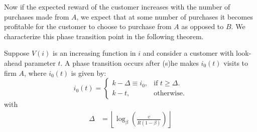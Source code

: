 Now if the expected reward of the customer increases with the number of purchases made from $A$, we expect that at some number of purchases it becomes profitable for the customer to choose to purchase from $A$ as opposed to $B$.
We characterize this phase transition point in the following theorem.

\begin{theorem} Suppose $V(i)$ is an increasing function in $i$ and consider a customer with look-ahead parameter $t$. A phase transition occurs after (s)he makes $i_0(t)$ visits to firm $A$, where $i_0(t)$ is given by:
\begin{equation}
  i_0(t)=\begin{cases}
    k-\Delta \equiv i_0, & \text{if $t \geq \Delta$}.\\
    k-t, & \text{otherwise}.
  \end{cases}
\end{equation}
with 
\begin{align}
\Delta &= \left\lfloor \log_{\beta}\left(\frac{v}{R(1-\beta)}\right)\right\rfloor
\end{align}
\end{theorem}

